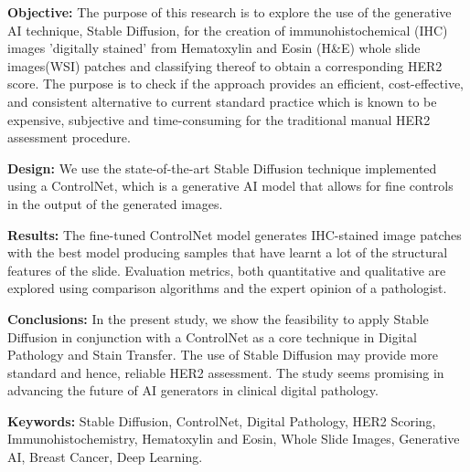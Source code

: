 


\begin{abstracts}        %

\textbf{Objective: }The purpose of this research is to explore the use of the generative AI technique, Stable Diffusion, for the creation of immunohistochemical (IHC) images 'digitally stained' from Hematoxylin and Eosin (H\&E) whole slide images(WSI) patches and classifying thereof to obtain a corresponding HER2 score. The purpose is to check if the approach provides an efficient, cost-effective, and consistent alternative to current standard practice which is known to be expensive, subjective and time-consuming for the traditional manual HER2 assessment procedure.

\textbf{Design:} We use the state-of-the-art Stable Diffusion technique implemented using a ControlNet, which is a generative AI model that allows for fine controls in the output of the generated images. 

\textbf{Results:} The fine-tuned ControlNet model generates IHC-stained image patches with the best model producing samples that have learnt a lot of the structural features of the slide. Evaluation metrics, both quantitative and qualitative are explored using comparison algorithms and the expert opinion of a pathologist.

\textbf{Conclusions:} In the present study, we show the feasibility to apply Stable Diffusion in conjunction with a ControlNet as a core technique in Digital Pathology and Stain Transfer. The use of Stable Diffusion may provide more standard and hence, reliable HER2 assessment. The study seems promising in advancing the future of AI generators in clinical digital pathology.

\textbf{Keywords:} Stable Diffusion, ControlNet, Digital Pathology, HER2 Scoring, Immunohistochemistry, Hematoxylin and Eosin, Whole Slide Images, Generative AI, Breast Cancer, Deep Learning.



\end{abstracts}



